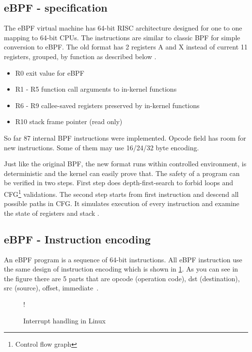 \subsection{eBPF - specification}
The eBPF virtual machine has 64-bit RISC architecture designed for one to one mapping to 64-bit CPUs. The instructions are similar to classic BPF for simple conversion to eBPF. The old format has 2 registers A and X instead of current 11 registers, grouped, by function as described below \cite{kernel_bpf_specification}.

\begin{itemize}
\item R0 exit value for eBPF
\item R1 - R5 function call arguments to in-kernel functions
\item R6 - R9 callee-saved registers preserved by in-kernel functions
\item R10 stack frame pointer (read only)
\end{itemize}

So far 87 internal BPF instructions were implemented. Opcode field has room for new instructions. Some of them may use 16/24/32 byte encoding.  

Just like the original BPF, the new format runs within controlled environment, is deterministic and the kernel can easily prove that.
The safety of a program can be verified in two steps.
First step does depth-first-search to forbid  loops and CFG\footnote{Control flow graph} validations.
The second step starts from first instruction and descend all possible paths in CFG. It simulates execution of every instruction and examine the state of registers and stack \cite{kernel_bpf_specification}.

\subsection{eBPF - Instruction encoding}
An eBPF program is a sequence of 64-bit instructions.
All eBPF instruction use the same design of instruction encoding which is shown in \ref{fig:tikz:eBPF_instruction}.
As you can see in the figure there are 5 parts that are opcode (operation code), dst (destination), src (source), offset, immediate~\cite{kernel_bpf_specification}.

\begin{figure}[h]
  \centering
  \resizebox {\textwidth} {!} {
    
  }
  \caption{Interrupt handling in Linux}
  \label{fig:tikz:eBPF_instruction}
\end{figure}

